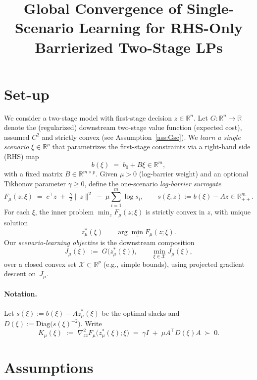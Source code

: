 \documentclass[11pt]{article}
\title{Global Convergence of Single-Scenario Learning for RHS-Only Barrierized Two-Stage LPs}
\author{}
\date{}
\theoremstyle{remark}
\begin{document}
\maketitle

\section{Set-up}

We consider a two-stage model with first-stage decision $z\in\mathbb{R}^n$. Let $G:\mathbb{R}^n\to\mathbb{R}$ denote the (regularized) downstream two-stage value function (expected cost), assumed $C^2$ and strictly convex (see Assumption~\ref{ass:Gsc}). We \emph{learn a single scenario} $\xi\in\mathbb{R}^p$ that parametrizes the first-stage constraints via a right-hand side (RHS) map
\[
b(\xi) \;=\; b_0 + B\xi \in \mathbb{R}^m ,
\]
with a fixed matrix $B\in\mathbb{R}^{m\times p}$.
Given $\mu>0$ (log-barrier weight) and an optional Tikhonov parameter $\gamma\ge 0$, define the one-scenario \emph{log-barrier surrogate}
\begin{equation}
\label{eq:F}
F_\mu(z;\xi) \;=\; c^\top z \;+\; \tfrac{\gamma}{2}\|z\|^2 \;-\; \mu \sum_{i=1}^m \log s_i,
\qquad
s(\xi,z) := b(\xi) - Az \in \mathbb{R}^m_{++}.
\end{equation}
For each $\xi$, the inner problem $\min_z F_\mu(z;\xi)$ is strictly convex in $z$, with unique solution
\[
z^*_\mu(\xi) \;=\; \arg\min_{z} F_\mu(z;\xi).
\]
Our \emph{scenario-learning objective} is the downstream composition
\[
J_\mu(\xi) \;:=\; G\big(z^*_\mu(\xi)\big), \qquad \min_{\xi\in \mathcal{X}} J_\mu(\xi),
\]
over a closed convex set $\mathcal{X}\subset\mathbb{R}^p$ (e.g., simple bounds), using projected gradient descent on~$J_\mu$.

\paragraph{Notation.}
Let $s(\xi) := b(\xi) - A z^*_\mu(\xi)$ be the optimal slacks and $D(\xi):=\mathrm{Diag}\big(s(\xi)^{-2}\big)$. Write
\begin{equation}
\label{eq:K}
K_\mu(\xi) \;:=\; \nabla^2_{zz} F_\mu\big(z^*_\mu(\xi);\xi\big) \;=\; \gamma I \;+\; \mu A^\top D(\xi) A \;\succ\; 0 .
\end{equation}

\section{Assumptions}
\end{document}
